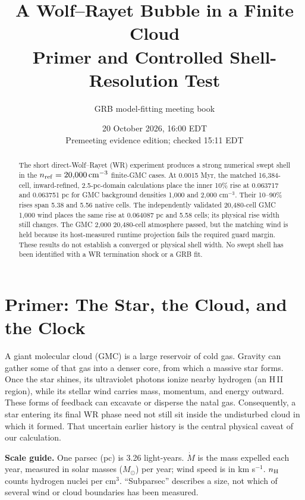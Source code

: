 \documentclass[10pt,letterpaper]{article}
\begin{document}
\title{A Wolf--Rayet Bubble in a Finite Cloud\\Primer and Controlled Shell-Resolution Test}
\author{GRB model-fitting meeting book}
\date{20 October 2026, 16:00 EDT\\Premeeting evidence edition; checked 15:11 EDT}
\maketitle

\begin{abstract}
The short direct-Wolf--Rayet (WR) experiment produces a strong numerical swept shell in the $n_{\rm ref}=20{,}000\,{\rm cm}^{-3}$ finite-GMC cases. At 0.0015 Myr, the matched 16,384-cell, inward-refined, 2.5-pc-domain calculations place the inner 10\% rise at 0.063717 and 0.063751 pc for GMC background densities 1,000 and 2,000 $\mathrm{cm}^{-3}$. Their 10--90\% rises span 5.38 and 5.56 native cells. The independently validated 20,480-cell GMC 1,000 wind places the same rise at 0.064087 pc and 5.58 cells; its physical rise width still changes. The GMC 2,000 20,480-cell atmosphere passed, but the matching wind is held because its host-measured runtime projection fails the required guard margin. These results do not establish a converged or physical shell width. No swept shell has been identified with a WR termination shock or a GRB fit.
\end{abstract}

\section{Primer: The Star, the Cloud, and the Clock}
A giant molecular cloud (GMC) is a large reservoir of cold gas. Gravity can gather some of that gas into a denser core, from which a massive star forms. Once the star shines, its ultraviolet photons ionize nearby hydrogen (an H\,II region), while its stellar wind carries mass, momentum, and energy outward. These forms of feedback can excavate or disperse the natal gas. Consequently, a star entering its final WR phase need not still sit inside the undisturbed cloud in which it formed. That uncertain earlier history is the central physical caveat of our calculation.

\textbf{Scale guide.} One parsec (pc) is 3.26 light-years. $\dot M$ is the mass expelled each year, measured in solar masses ($M_\odot$) per year; wind speed is in km s$^{-1}$. $n_{\rm H}$ counts hydrogen nuclei per cm$^3$. ``Subparsec'' describes a size, not which of several wind or cloud boundaries has been measured.
\end{document}
